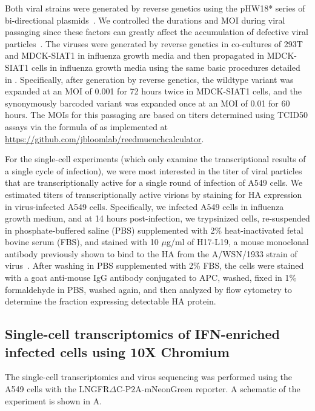 \documentclass[9pt,lineno]{elife}
\begin{document}
Both viral strains were generated by reverse genetics using the pHW18* series of bi-directional plasmids~\citep{hoffmann2000dna}.
We controlled the durations and MOI during viral passaging since these factors can greatly affect the accumulation of defective viral particles~\citep{xue2016propagation}.
The viruses were generated by reverse genetics in co-cultures of 293T and MDCK-SIAT1 in influenza growth media and then propagated in MDCK-SIAT1 cells in influenza growth media using the same basic procedures detailed in \citet{russell2018extreme}.
Specifically, after generation by reverse genetics, the wildtype variant was expanded at an MOI of 0.001 for 72 hours twice in MDCK-SIAT1 cells, and the synonymously barcoded variant was expanded once at an MOI of 0.01 for 60 hours.
The MOIs for this passaging are based on titers determined using TCID50 assays via the formula of \citet{reed1938simple} as implemented at \url{https://github.com/jbloomlab/reedmuenchcalculator}.

For the single-cell experiments (which only examine the transcriptional results of a single cycle of infection), we were most interested in the titer of viral particles that are transcriptionally active for a single round of infection of A549 cells.
We estimated titers of transcriptionally active virions by staining for HA expression in virus-infected A549 cells.
Specifically, we infected A549 cells in influenza growth medium, and at 14 hours post-infection, we trypsinized cells, re-suspended in phosphate-buffered saline (PBS) supplemented with 2\% heat-inactivated fetal bovine serum (FBS), and stained with 10 $\mu$g/ml of H17-L19, a mouse monoclonal antibody previously shown to bind to the HA from the A/WSN/1933 strain of virus~\citep{doud2017complete}.
After washing in PBS supplemented with 2\% FBS, the cells were stained with a goat anti-mouse IgG antibody conjugated to APC, washed, fixed in 1\% formaldehyde in PBS, washed again, and then analyzed by flow cytometry to determine the fraction expressing detectable HA protein.

\subsection{Single-cell transcriptomics of IFN-enriched infected cells using 10X Chromium}
The single-cell transcriptomics and virus sequencing was performed using the A549 cells with the LNGFR$\Delta$C-P2A-mNeonGreen reporter.
A schematic of the experiment is shown in A.
\end{document}
